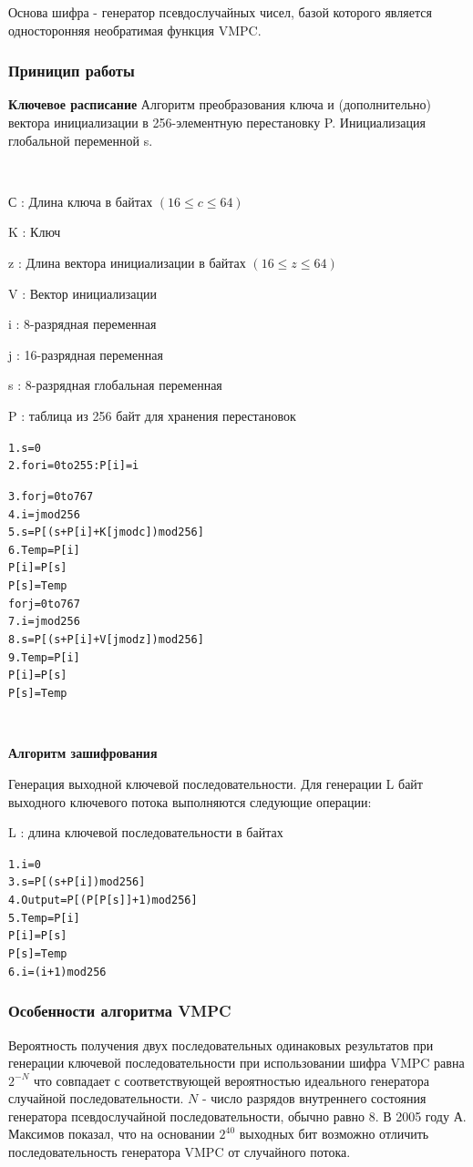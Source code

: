 \documentclass[a4paper]{report}
\begin{document}
Основа шифра - генератор псевдослучайных чисел, базой которого является односторонняя необратимая функция VMPC.

\subsubsection{Приницип работы}

\textbf{Ключевое расписание}
Алгоритм преобразования ключа и (дополнительно) вектора инициализации в 256-элементную перестановку P. Инициализация глобальной переменной s.

~

С : Длина ключа в байтах $(16\leq c\leq 64)$ 

K : Ключ 

z : Длина вектора инициализации в байтах $(16\leq z\leq 64)$ 

V : Вектор инициализации 

i : 8-разрядная переменная 

j : 16-разрядная переменная 

s : 8-разрядная глобальная переменная 

P : таблица из 256 байт для хранения перестановок 

\begin{alltt}
1.  s = 0
2.  for i = 0 to 255: P[i] = i

3.  for j = 0 to 767 
	4.  i = j mod 256
	5.  s = P[(s + P[i] + K[j mod c]) mod 256]
	6.  Temp = P[i]
  	    P[i] = P[s]
  	    P[s] = Temp
	for j = 0 to 767 
7.  i = j mod 256
8.  s = P[(s + P[i] + V[j mod z]) mod 256]
9. Temp = P[i]
    P[i] = P[s]
    P[s] = Temp
\end{alltt}
 
~

\textbf{Алгоритм зашифрования}

Генерация выходной ключевой последовательности.
Для генерации L байт выходного ключевого потока выполняются следующие операции: 

L : длина ключевой последовательности в байтах

\begin{alltt}
1. i = 0
	3. s = P[(s + P[i]) mod 256]
	4. Output = P[(P[P[s]] + 1) mod 256]
	5. Temp = P[i]
  	   P[i] = P[s]
  	   P[s] = Temp
	6. i = (i + 1) mod 256
\end{alltt}

\subsubsection{Особенности алгоритма VMPC}
Вероятность получения двух последовательных одинаковых результатов при генерации ключевой последовательности при использовании шифра VMPC равна $2^{-N}$ что совпадает с соответствующей вероятностью идеального генератора случайной последовательности.  $N$ -  число разрядов внутреннего состояния генератора псевдослучайной последовательности, обычно равно $8$. В 2005 году А. Максимов показал, что на основании $2^{40}$ выходных бит возможно отличить последовательность генератора VMPC от случайного потока.
\end{document}
